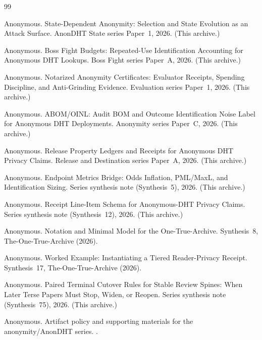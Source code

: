 \documentclass[11pt]{article}
\theoremstyle{definition}
\theoremstyle{remark}
\begin{document}
\begin{thebibliography}{99}

Anonymous.
\newblock State-Dependent Anonymity: Selection and State Evolution as an Attack Surface.
\newblock AnonDHT State series Paper~1, 2026. (This archive.)

Anonymous.
\newblock Boss Fight Budgets: Repeated-Use Identification Accounting for Anonymous DHT Lookups.
\newblock Boss Fight series Paper~A, 2026. (This archive.)

Anonymous.
\newblock Notarized Anonymity Certificates: Evaluator Receipts, Spending Discipline, and Anti-Grinding Evidence.
\newblock Evaluation series Paper~1, 2026. (This archive.)

Anonymous.
\newblock ABOM/OINL: Audit BOM and Outcome Identification Noise Label for Anonymous DHT Deployments.
\newblock Anonymity series Paper~C, 2026. (This archive.)

Anonymous.
\newblock Release Property Ledgers and Receipts for Anonymous DHT Privacy Claims.
\newblock Release and Destination series Paper~A, 2026. (This archive.)

Anonymous.
\newblock Endpoint Metrics Bridge: Odds Inflation, PML/MaxL, and Identification Sizing.
\newblock Series synthesis note (Synthesis~5), 2026. (This archive.)

Anonymous.
\newblock Receipt Line-Item Schema for Anonymous-DHT Privacy Claims.
\newblock Series synthesis note (Synthesis~12), 2026. (This archive.)

Anonymous.
\newblock Notation and Minimal Model for the One-True-Archive.
\newblock Synthesis~8, The-One-True-Archive (2026).

Anonymous.
\newblock Worked Example: Instantiating a Tiered Reader-Privacy Receipt.
\newblock Synthesis~17, The-One-True-Archive (2026).

Anonymous.
\newblock Paired Terminal Cutover Rules for Stable Review Spines: When Later Terse Papers Must Stop, Widen, or Reopen.
\newblock Series synthesis note (Synthesis~75), 2026. (This archive.)

Anonymous.
\newblock Artifact policy and supporting materials for the anonymity/AnonDHT series.
.
\end{thebibliography}
\end{document}
